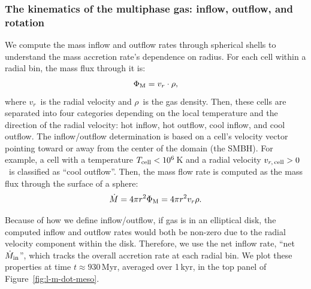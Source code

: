 \subsubsection{The kinematics of the multiphase gas: inflow, outflow, and rotation} \label{subsec:m-dot-scaling}

We compute the mass inflow and outflow rates through spherical shells to understand the mass accretion rate's dependence on radius.
For each cell within a radial bin, the mass flux through it is:
\begin{equation}
    \Phi_{\rm M} = v_r \cdot \rho,
\end{equation}
where $v_r$\ is the radial velocity and $\rho$\ is the gas density.
Then, these cells are separated into four categories depending on the local temperature and the direction of the radial velocity: hot inflow, hot outflow, cool inflow, and cool outflow.
The inflow/outflow determination is based on a cell's velocity vector pointing toward or away from the center of the domain (the SMBH).
For example, a cell with a temperature $T_{\rm cell} < 10^6$\,K and a radial velocity $v_{r, \,\rm cell} > 0$\ is classified as ``cool outflow''.
Then, the mass flow rate is computed as the mass flux through the surface of a sphere:
\begin{equation} \label{eq:accretion-from-flux}
    \dot{M} = 4 \pi r^2 \Phi_{\rm M} = 4 \pi r^2 v_r \rho.
\end{equation}

Because of how we define inflow/outflow, if gas is in an elliptical disk, the computed inflow and outflow rates would both be non-zero due to the radial velocity component within the disk.
Therefore, we use the net inflow rate, ``net $\dot{M}_{\rm in}$'', which tracks the overall accretion rate at each radial bin.
We plot these properties at time $t \approx 930$\,Myr, averaged over 1\,kyr, in the top panel of Figure~\ref{fig:l-m-dot-meso}.

